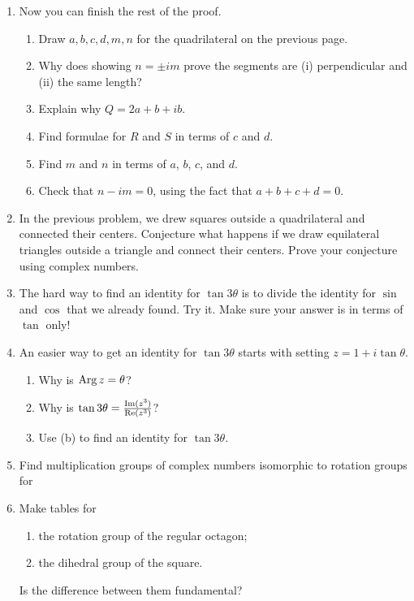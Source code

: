 \documentclass[../textbook.tex]{subfiles}
\begin{document}
\begin{enumerate}
\setcounter{enumi}{\value{problem_i}}
\item Now you can finish the rest of the proof.
\begin{enumerate}
\item Draw $a,b,c,d,m,n$ for the quadrilateral on the previous page.
\item Why does showing $n=\pm im$ prove the segments are (i) perpendicular and (ii) the same length?
\item Explain why $Q=2a+b+ib$.
\item Find formulae for $R$ and $S$ in terms of $c$ and $d$.
\item Find $m$ and $n$ in terms of $a$, $b$, $c$, and $d$.
\item Check that $n-im=0$, using the fact that $a+b+c+d=0$.
\end{enumerate}
\item In the previous problem, we drew squares outside a quadrilateral and connected their centers. Conjecture what happens if we draw equilateral triangles outside a triangle and connect their centers. Prove your conjecture using complex numbers.
\item The hard way to find an identity for $\tan 3\theta$ is to divide the identity for $\sin$ and $\cos$ that we already found. Try it. Make sure your answer is in terms of $\tan$ only!
\item An easier way to get an identity for $\tan 3\theta$ starts with setting $z = 1 + i\tan\theta$.
\begin{enumerate}
\item Why is $\operatorname{Arg} z = \theta$?
\item Why is $\tan 3\theta = \frac{\operatorname{Im}(z^3)}{\operatorname{Re}(z^3)}$?
\item Use (b) to find an identity for $\tan 3\theta$.
\end{enumerate}
\item Find multiplication groups of complex numbers isomorphic to rotation groups for
\begin{enumerate}
\end{enumerate}
\item Make tables for
\begin{enumerate}
\item the rotation group of the regular octagon;
\item the dihedral group of the square.
\end{enumerate}
Is the difference between them fundamental?


\end{enumerate}
\end{document}
